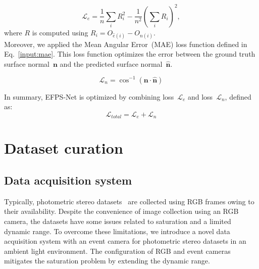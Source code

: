 \documentclass[preprint,12pt,authoryear]{elsarticle}
\begin{document}
\begin{equation}
\mathcal{L}_{e} = \frac{1}{n}\sum_{i}R^{2}_{i}-\frac{1}{n^{2}}(\sum_{i}R_{i})^{2},
\label{input:scale-invariant}
\end{equation}
where $R$ is computed using $R_{i} = O_{\hat{e}(i)} - O_{n(i)}$.\\

Moreover, we applied the Mean Angular Error~(MAE) loss function defined in Eq.~\ref{input:mae}. This loss function optimizes the error between the ground truth surface normal~$\textbf{n}$ and the predicted surface normal~$\hat{\textbf{n}}$.

\begin{equation}
\mathcal{L}_{n} = \cos^{-1}(\textbf{n}\cdot \hat{\textbf{n}})
\label{input:mae}
\end{equation}

In summary, EFPS-Net is optimized by combining loss~$\mathcal{L}_{e}$ and loss~$\mathcal{L}_{n}$, defined as:
\begin{equation}
\mathcal{L}_{total} = \mathcal{L}_{e} + \mathcal{L}_{n}
\label{input:total}
\end{equation}

\section{Dataset curation}
\subsection{Data acquisition system}
Typically, photometric stereo datasets~\citep{chen2018ps,ikehata2018cnn,shi2016benchmark} are collected using RGB frames owing to their availability.
Despite the convenience of image collection using an RGB camera, the datasets have some issues related to saturation and a limited dynamic range. To overcome these limitations, we introduce a novel data acquisition system with an event camera for photometric stereo datasets in an ambient light environment. The configuration of RGB and event cameras mitigates the saturation problem by extending the dynamic range.
\end{document}
